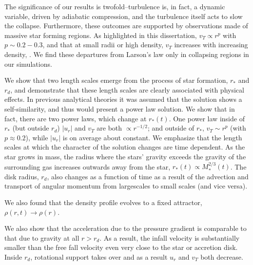 \documentclass[../dissertation.tex]{subfiles}
\begin{document}
The significance of our results is twofold--turbulence is, in fact, a dynamic variable, driven by adiabatic compression, 
and the turbulence itself acts to slow the collapse. 
Furthermore, these outcomes are supported by observations made of massive star forming regions. 
As highlighted in this dissertation,  $v_T \propto r^p$ with $ p \sim 0.2-0.3$, and that at small radii or high density, $v_T$  
increases with increasing density, \citep{1997ApJ...476..730P}. 
We find these departures from Larson's law only in collapsing regions in our simulations. 

We show that two length scales emerge from the process of star formation, $r_*$ and $r_d$, and demonstrate
that these length scales are clearly associated with physical effects. 
In previous analytical theories it was assumed that the solution shows a self-similarity, and thus would present a power law solution.
We show that in fact, there are two power laws, which change at $r_*(t)$. 
One power law inside of $r_*$ (but outside $r_d$) $|u_r|$ and  $v_T$ are both
$\propto r^{-1/2}$; and outside of $r_*$, $v_T\sim r^{p}$ (with $p\approx0.2$), while $|u_r|$ 
is on average about constant. 
We emphasize that the length scales at which the character of the solution changes are time dependent. 
As the star grows in mass, the radius where the stars' gravity exceeds the gravity of the surrounding gas increases outwards away from the star, 
$r_*(t) \propto M_*^{2/3}(t)$.
The disk radius, $r_d$, also changes as a function of time as a result of the advection and transport of angular momentum from largescales to small scales (and vice versa).

We also found that the density profile evolves
to a fixed attractor, $\rho(r,t ) \rightarrow \rho(r)$. 

We also show that the acceleration 
due to the pressure gradient is comparable to that due to gravity at all $r>r_d$. 
As a result, the infall velocity is substantially smaller than the free fall velocity
even very close to the star or accretion disk. Inside $r_d$, rotational support takes over 
and as a result $u_r$ and $v_T$ both decrease.  
\end{document}
